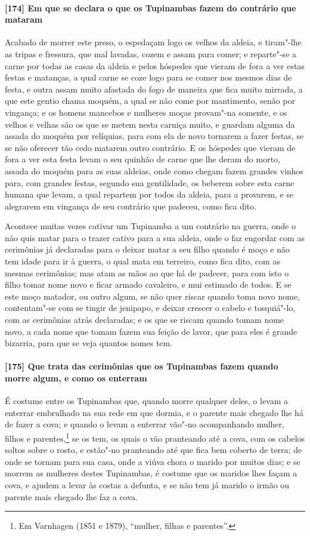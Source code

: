 \paragraph{[174] Em que se declara o que os Tupinambas fazem do contrário que mataram}\quad
Acabado de morrer este preso, o espedaçam logo os velhos da aldeia, e tiram"-lhe as tripas
e fressura, que mal lavadas, cozem e assam para comer; e reparte"-se a carne por todas as
casas da aldeia e pelos hóspedes que vieram de fora a ver estas festas e matanças, a qual
carne se coze logo para se comer nos mesmos dias de festa, e outra assam muito afastada do
fogo de maneira que fica muito mirrada, a que este gentio chama moquém, a qual se não come
por mantimento, senão por vingança; e os homens mancebos e mulheres moças provam"-na
somente, e os velhos e velhas são os que se metem nesta carniça muito, e guardam alguma da
assada do moquém por relíquias, para com ela de novo tornarem a fazer festas, se se não
oferecer tão cedo matarem outro contrário. E os hóspedes que vieram de fora a ver esta
festa levam o seu quinhão de carne que lhe deram do morto, assada do moquém para as suas
aldeias, onde como chegam fazem grandes vinhos para, com grandes festas, segundo sua
gentilidade, os beberem sobre esta carne humana que levam, a qual repartem por todos da
aldeia, para a provarem, e se alegrarem em vingança de seu contrário que padeceu, como
fica dito.

Acontece muitas vezes cativar um Tupinamba a um contrário na guerra, onde o não quis matar
para o trazer cativo para a sua aldeia, onde o faz engordar com as cerimônias já
declaradas para o deixar matar a seu filho quando é moço e não tem idade para ir à guerra,
o qual mata em terreiro, como fica dito, com as mesmas cerimônias; mas atam as mãos ao que
há de padecer, para com isto o filho tomar nome novo e ficar armado cavaleiro, e mui
estimado de todos. E se este moço matador, ou outro algum, se não quer riscar quando toma
novo nome, contentam"-se com se tingir de jenipapo, e deixar crescer o cabelo e tosquiá"-lo,
com as cerimônias atrás declaradas; e os que se riscam quando tomam nome novo, a cada nome
que tomam fazem sua feição de lavor, que para eles é grande bizarria, para que se veja
quantos nomes tem.

\paragraph{[175] Que trata das cerimônias que os Tupinambas fazem quando morre algum, e como
os enterram}\quad
É costume entre os Tupinambas que, quando morre qualquer deles, o levam a enterrar
embrulhado na sua rede em que dormia, e o parente mais chegado lhe há de fazer a cova; e
quando o levam a enterrar vão"-no acompanhando mulher, filhos e parentes,\footnote{ Em
Varnhagen (1851 e 1879), ``mulher, filhas e parentes''.} se os tem, os quais o vão
pranteando até a cova, com os cabelos soltos sobre o rosto, e estão"-no pranteando até que
fica bem coberto de terra; de onde se tornam para sua casa, onde a viúva chora o marido
por muitos dias; e se morrem as mulheres destes Tupinambas, é costume que os maridos lhes
façam a cova, e ajudem a levar às costas a defunta, e se não tem já marido o irmão ou
parente mais chegado lhe faz a cova.

